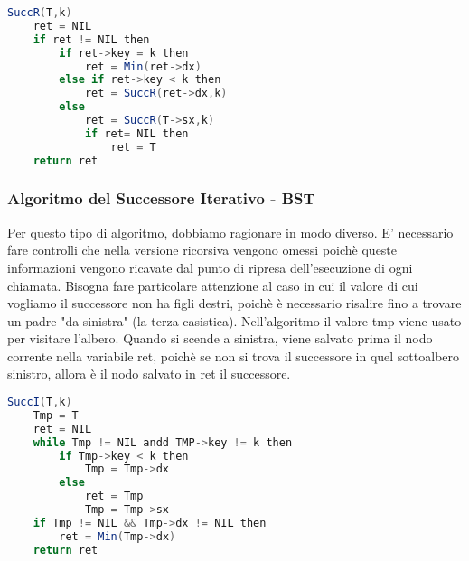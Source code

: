 \begin{lstlisting}[language=Java]
	SuccR(T,k)
	ret = NIL
	if ret != NIL then
		if ret->key = k then
			ret = Min(ret->dx)
		else if ret->key < k then
			ret = SuccR(ret->dx,k)
		else 
			ret = SuccR(T->sx,k)
			if ret= NIL then
				ret = T
	return ret
\end{lstlisting}

\subsubsection{Algoritmo del Successore Iterativo - BST}

Per questo tipo di algoritmo, dobbiamo ragionare in modo diverso.
E' necessario fare controlli che nella versione ricorsiva vengono omessi poichè queste informazioni vengono ricavate dal punto di ripresa dell'esecuzione di ogni chiamata. 
Bisogna fare particolare attenzione al caso in cui il valore di cui vogliamo il successore non ha figli destri, poichè è necessario risalire fino a trovare un padre "da sinistra" (la terza casistica).
Nell'algoritmo il valore tmp viene usato per visitare l'albero. Quando si scende a sinistra, viene salvato prima il nodo corrente nella variabile ret, poichè se non si trova il successore in quel sottoalbero sinistro, allora è il nodo salvato in ret il successore.

\begin{lstlisting}[language=Java]
	SuccI(T,k)
	Tmp = T
	ret = NIL
	while Tmp != NIL andd TMP->key != k then
		if Tmp->key < k then
			Tmp = Tmp->dx
		else 
			ret = Tmp
			Tmp = Tmp->sx
	if Tmp != NIL && Tmp->dx != NIL then
		ret = Min(Tmp->dx)
	return ret
\end{lstlisting}
